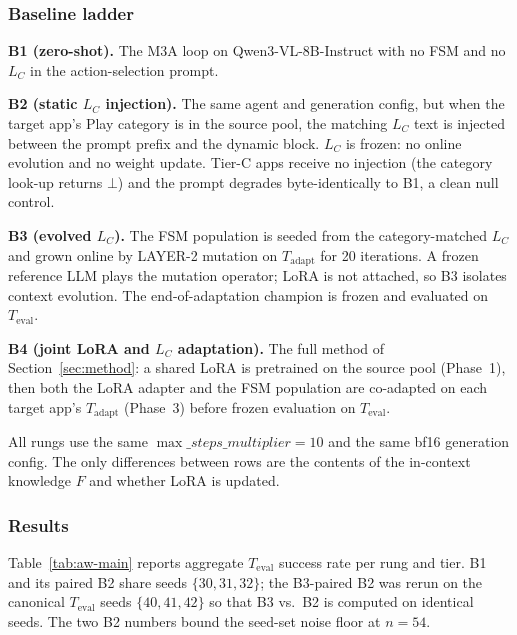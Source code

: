 \subsubsection{Baseline ladder}
\label{sec:exp-within-baselines}

\textbf{B1 (zero-shot).} The M3A loop on Qwen3-VL-8B-Instruct with no FSM and no
$L_C$ in the action-selection prompt.

\textbf{B2 (static $L_C$ injection).} The same agent and generation config, but
when the target app's Play category is in the source pool, the matching $L_C$
text is injected between the prompt prefix and the dynamic block. $L_C$ is
frozen: no online evolution and no weight update. Tier-C apps receive no
injection (the category look-up returns $\bot$) and the prompt degrades
byte-identically to B1, a clean null control.

\textbf{B3 (evolved $L_C$).} The FSM population is seeded from the
category-matched $L_C$ and grown online by LAYER-2 mutation on $T_{\text{adapt}}$
for 20 iterations. A frozen reference LLM plays the mutation operator; LoRA is
not attached, so B3 isolates context evolution. The end-of-adaptation champion
is frozen and evaluated on $T_{\text{eval}}$.

\textbf{B4 (joint LoRA and $L_C$ adaptation).} The full method of
Section~\ref{sec:method}: a shared LoRA is pretrained on the source pool
(Phase~1), then both the LoRA adapter and the FSM population are co-adapted on
each target app's $T_{\text{adapt}}$ (Phase~3) before frozen evaluation on
$T_{\text{eval}}$.

All rungs use the same $\max\_steps\_multiplier{=}10$ and the same bf16
generation config. The only differences between rows are the contents of the
in-context knowledge $F$ and whether LoRA is updated.

\subsubsection{Results}
\label{sec:exp-within-results}

Table~\ref{tab:aw-main} reports aggregate $T_{\text{eval}}$ success rate per rung
and tier. B1 and its paired B2 share seeds $\{30,31,32\}$; the B3-paired B2 was
rerun on the canonical $T_{\text{eval}}$ seeds $\{40,41,42\}$ so that B3 vs.\ B2
is computed on identical seeds. The two B2 numbers bound the seed-set noise
floor at $n{=}54$.

